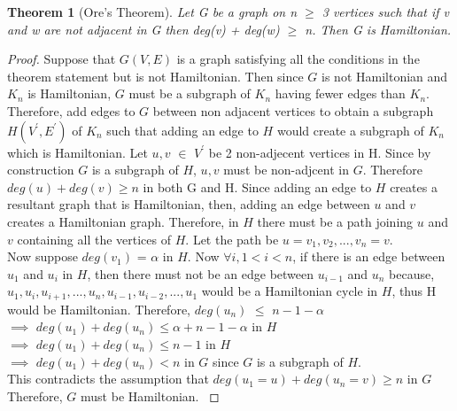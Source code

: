 \documentclass{article}
\newtheorem{theorem}[definition]{Theorem}
\begin{document}
\begin{theorem}[Ore's Theorem]
\label{ore's theorem}
Let G be a graph on n $\geq$ 3 vertices such that if v and w are not adjacent in G then deg(v) + deg(w) $\geq$ n. Then G is Hamiltonian. {}
\end{theorem}
\begin{proof}
Suppose that $\mathit{G(V,E)}$ is a graph satisfying all the conditions in the theorem statement but is not Hamiltonian. Then since $\mathit{G}$ is not Hamiltonian and $K_n$ is Hamiltonian, $\mathit{G}$ must be a subgraph of $\mathit{K_n}$ having fewer edges than $\mathit{K_n}$. Therefore, add edges to $\mathit{G}$ between non adjacent vertices to obtain a subgraph $\mathit{H(V^\prime,E^\prime)}$ of $\mathit{K_n}$ such that adding an edge to $\mathit{H}$ would create a subgraph of $\mathit{K_n}$ which is Hamiltonian. Let $\mathit{u, v}$ $\in$ $V^\prime$ be 2 non-adjecent vertices in H. Since by construction $\mathit{G}$ is a subgraph of $\mathit{H}$, $\mathit{u, v}$ must be non-adjcent in $\mathit{G}$. Therefore $\mathit{deg(u) + deg(v) \geq n}$ in both G and H. Since adding an edge to $\mathit{H}$ creates a resultant graph that is Hamiltonian, then, adding an edge between $\mathit{u}$ and $\mathit{v}$ creates a Hamiltonian graph. Therefore, in $\mathit{H}$ there must be a path joining $\mathit{u}$ and $\mathit{v}$ containing all the vertices of $\mathit{H}$. Let the path be $\mathit{u = v_1, v_2, ..., v_n = v}$.\\
Now suppose $\mathit{deg(v_1)}$ = $\alpha$ in $\mathit{H}$. Now $\forall \mathit{i}, 1 <  i < \mathit{n}$, if there is an edge between $\mathit{u_1}$ and $\mathit{u_i}$ in $\mathit{H}$, then there must not be an edge between $\mathit{u_{i-1}}$ and $\mathit{u_n}$ because, $\mathit{u_1, u_i, u_{i+1}, ..., u_n, u_{i-1}, u_{i-2}, ..., u_1}$ would be a Hamiltonian cycle in $\mathit{H}$, thus H would be Hamiltonian. Therefore, $\mathit{deg(u_n)}$ $\leq$ $\mathit{n-1-\alpha}$\\
$\implies$ $\mathit{deg(u_1) + deg(u_n) \leq \alpha +  n-1 - \alpha}$ in $\mathit{H}$\\
$\implies$ $\mathit{deg(u_1) + deg(u_n) \leq n-1}$ in $\mathit{H}$\\
$\implies$ $\mathit{deg(u_1) + deg(u_n) < n}$ in $\mathit{G}$ since $\mathit{G}$ is a subgraph of $\mathit{H}$.\\
This contradicts the assumption that $\mathit{deg(u_1 = u) + deg(u_n = v) \geq n}$ in $\mathit{G}$ \\
Therefore, $\mathit{G}$ must be Hamiltonian. \cite{ray_2013}
\end{proof}
\end{document}
